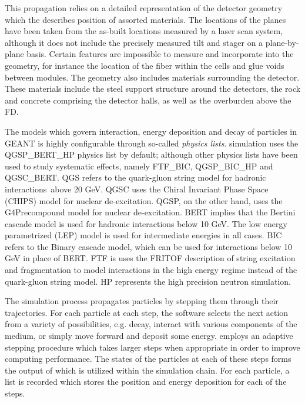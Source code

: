 This propagation relies on a detailed representation of the detector geometry which the describes position of assorted materials.  The locations of the planes have been taken from the as-built locations measured by a laser scan system, although it does not include the precisely measured tilt and stager on a plane-by-plane basis.  Certain features are impossible to measure and incorporate into the geometry, for instance the location of the fiber within the cells and glue voids between modules.  The geometry also includes materials surrounding the detector.  These materials include the steel support structure around the detectors, the rock and concrete comprising the detector halls, as well as the overburden above the FD.

The models which govern interaction, energy deposition and decay of particles in GEANT is highly configurable through so-called \textit{physics lists}.  \nova simulation uses the QGSP\_BERT\_HP physics list by default; although other physics lists have been used to study systematic effects, namely FTF\_BIC, QGSP\_BIC\_HP and QGSC\_BERT.  QGS refers to the quark-gluon string model for hadronic interactions above 20 GeV. \cite{kaidalov1982pomeron}  QGSC uses the Chiral Invariant Phase Space (CHIPS) model for nuclear de-excitation. \cite{kossov2002chiral}  QGSP, on the other hand, uses the G4Precompound model for nuclear de-excitation.  BERT implies that the Bertini cascade model is used for hadronic interactions below 10 GeV. \cite{bertini1971news,guthrie1968calculation}  The low energy parametrized (LEP) model is used for intermediate energies in all cases.  BIC refers to the Binary cascade model, which can be used for interactions below 10 GeV in place of BERT. \cite{folger2004binary}  FTF is uses the FRITOF description of string excitation and fragmentation to model interactions in the high energy regime instead of the quark-gluon string model. \cite{andersson1993fritiof}  HP represents the \geant high precision neutron simulation.

The \geant simulation process propagates particles by stepping them through their trajectories.  For each particle at each step, the software selects the next action from a variety of possibilities, e.g. decay, interact with various components of the medium, or simply move forward and deposit some energy.  \geant employs an adaptive stepping procedure which takes larger steps when appropriate in order to improve computing performance.  The states of the particles at each of these steps forms the output of \geant which is utilized within the \nova simulation chain.  For each particle, a list is recorded which stores the position and energy deposition for each of the steps.

